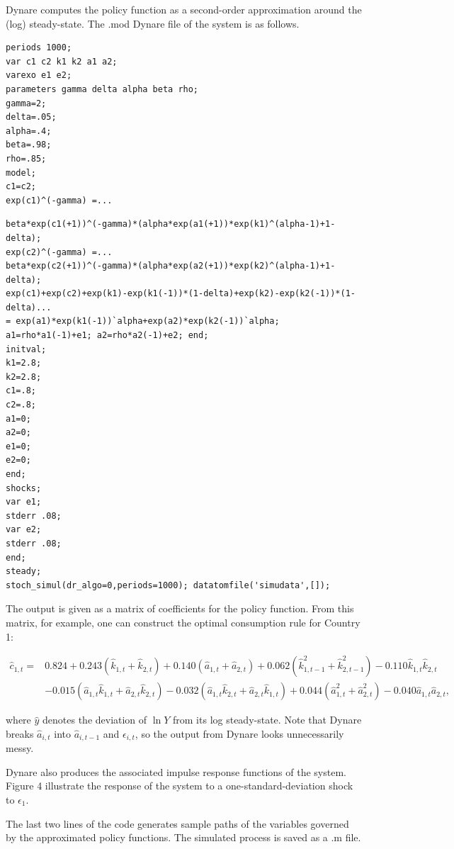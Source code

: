 \documentclass[10pt]{article}
\begin{document}
Dynare computes the policy function as a second-order approximation around the (log) steady-state. The .mod Dynare file of the system is as follows.

\begin{verbatim}
periods 1000;
var c1 c2 k1 k2 a1 a2;
varexo e1 e2;
parameters gamma delta alpha beta rho;
gamma=2;
delta=.05;
alpha=.4;
beta=.98;
rho=.85;
model;
c1=c2;
exp(c1)^(-gamma) =...
\end{verbatim}

\begin{verbatim}
beta*exp(c1(+1))^(-gamma)*(alpha*exp(a1(+1))*exp(k1)^(alpha-1)+1-delta);
exp(c2)^(-gamma) =...
beta*exp(c2(+1))^(-gamma)*(alpha*exp(a2(+1))*exp(k2)^(alpha-1)+1-delta);
exp(c1)+exp(c2)+exp(k1)-exp(k1(-1))*(1-delta)+exp(k2)-exp(k2(-1))*(1-delta)...
= exp(a1)*exp(k1(-1))`alpha+exp(a2)*exp(k2(-1))`alpha;
a1=rho*a1(-1)+e1; a2=rho*a2(-1)+e2; end;
initval;
k1=2.8;
k2=2.8;
c1=.8;
c2=.8;
a1=0;
a2=0;
e1=0;
e2=0;
end;
shocks;
var e1;
stderr .08;
var e2;
stderr .08;
end;
steady;
stoch_simul(dr_algo=0,periods=1000); datatomfile('simudata',[]);
\end{verbatim}

The output is given as a matrix of coefficients for the policy function. From this matrix, for example, one can construct the optimal consumption rule for Country 1:

$$
\begin{aligned}
\hat{c}_{1, t}= & 0.824+0.243\left(\hat{k}_{1, t}+\hat{k}_{2, t}\right)+0.140\left(\hat{a}_{1, t}+\hat{a}_{2, t}\right)+0.062\left(\hat{k}_{1, t-1}^{2}+\hat{k}_{2, t-1}^{2}\right)-0.110 \hat{k}_{1, t} \hat{k}_{2, t} \\
& -0.015\left(\hat{a}_{1, t} \hat{k}_{1, t}+\hat{a}_{2, t} \hat{k}_{2, t}\right)-0.032\left(\hat{a}_{1, t} \hat{k}_{2, t}+\hat{a}_{2, t} \hat{k}_{1, t}\right)+0.044\left(\hat{a}_{1, t}^{2}+\hat{a}_{2, t}^{2}\right)-0.040 \hat{a}_{1, t} \hat{a}_{2, t},
\end{aligned}
$$

where $\hat{y}$ denotes the deviation of $\ln Y$ from its log steady-state. Note that Dynare breaks $\hat{a}_{i, t}$ into $\hat{a}_{i, t-1}$ and $\epsilon_{i, t}$, so the output from Dynare looks unnecessarily messy.

Dynare also produces the associated impulse response functions of the system. Figure 4 illustrate the response of the system to a one-standard-deviation shock to $\epsilon_{1}$.

The last two lines of the code generates sample paths of the variables governed by the approximated policy functions. The simulated process is saved as a .m file.
\end{document}
